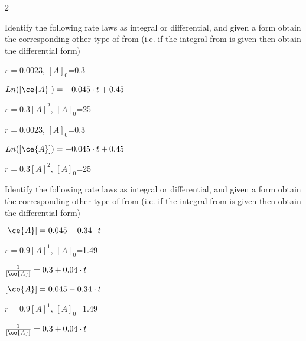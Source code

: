 \documentclass[main.tex]{subfiles}
\begin{document}
\begin{multicols*}{2}
\begin{question}[ID=\the\value{numA}]
Identify the following rate laws as integral or differential, and given a form obtain the corresponding other type of from (i.e. if the integral from is given then obtain the differential form)
\begin{inparaenum}[(a)]
\item 	  $r=0.0023$, $[A]_0$=0.3  	%
\item $Ln([\ce{A}])=-0.045\cdot t+0.45$	%
\item 	   $r=0.3[A]^2$, $[A]_0$=25   	%
\end{inparaenum}
\end{question}
\begin{solution}
\begin{inparaenum}[(a)]
\item 	  $r=0.0023$, $[A]_0$=0.3  	%
\item $Ln([\ce{A}])=-0.045\cdot t+0.45$	%
\item 	   $r=0.3[A]^2$, $[A]_0$=25   	%
\end{inparaenum}\hspace{0.1cm}\end{solution}%


\begin{question}[ID=\the\value{numA}]
Identify the following rate laws as integral or differential, and given a form obtain the corresponding other type of from (i.e. if the integral from is given then obtain the differential form)
\begin{inparaenum}[(a)]
\item $[\ce{A}] =0.045 -0.34\cdot t $	 	%
\item 	   $r=0.9[A]^1$, $[A]_0$=1.49   %
\item $\frac{1}{[\ce{A}]}=0.3+0.04\cdot t $	%
\end{inparaenum}
\end{question}
\begin{solution}
\begin{inparaenum}[(a)]
\item $[\ce{A}] =0.045 -0.34\cdot t $	 	%
\item 	   $r=0.9[A]^1$, $[A]_0$=1.49   %
\item $\frac{1}{[\ce{A}]}=0.3+0.04\cdot t $	%
\end{inparaenum}\hspace{0.1cm}\end{solution}%



\end{multicols*}
\end{document}
